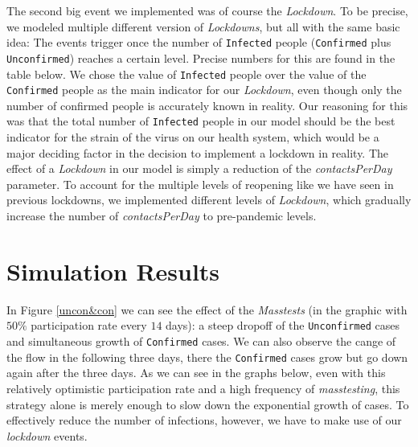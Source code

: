 \documentclass
[
    report,
    11pt,
    bibliography = totoc,
    listof = totoc,
    headinclude = true,
]
{scrreport}
\begin{document}
The second big event we implemented was of course the \textit{Lockdown}. To be precise,
we modeled multiple different version of \textit{Lockdowns}, but all with the same basic idea:
The events trigger once the number of \texttt{Infected} people (\texttt{Confirmed} plus \texttt{Unconfirmed})
reaches a certain level. Precise numbers for this are found in the table below.
We chose the value of \texttt{Infected} people over the value of
the \texttt{Confirmed} people as the main indicator for our \textit{Lockdown}, even though only the number of confirmed people is accurately known in reality.
Our reasoning for this was that the total number of \texttt{Infected} people in our
model should be the best indicator for the strain of the virus on our health system,
which would be a major deciding factor in the decision to implement a lockdown in reality.
The effect of a \textit{Lockdown} in our model is simply a reduction of the \textit{contactsPerDay} parameter.
To account for the multiple levels of reopening like we have seen in previous
lockdowns, we implemented different levels of \textit{Lockdown}, which gradually increase
the number of \textit{contactsPerDay} to pre-pandemic levels.


\begingroup
\renewcommand{\cleardoublepage}{}
\renewcommand{\clearpage}{}
\chapter{Simulation Results}
\endgroup

In Figure \ref{uncon&con} we can see the effect of the \textit{Masstests} (in the graphic with $50 \%$ participation rate every $14$ days): a steep dropoff of the \texttt{Unconfirmed} cases and simultaneous growth of \texttt{Confirmed} cases. We can also observe the cange of the flow in the following three days, there the \texttt{Confirmed} cases grow but go down again after the three days.
As we can see in the graphs below, even with this relatively optimistic participation rate
and a high frequency of \textit{masstesting}, this strategy alone is merely enough
to slow down the exponential growth of cases.
To effectively reduce the number of infections, however, we have to make use of our \textit{lockdown} events.
\end{document}
